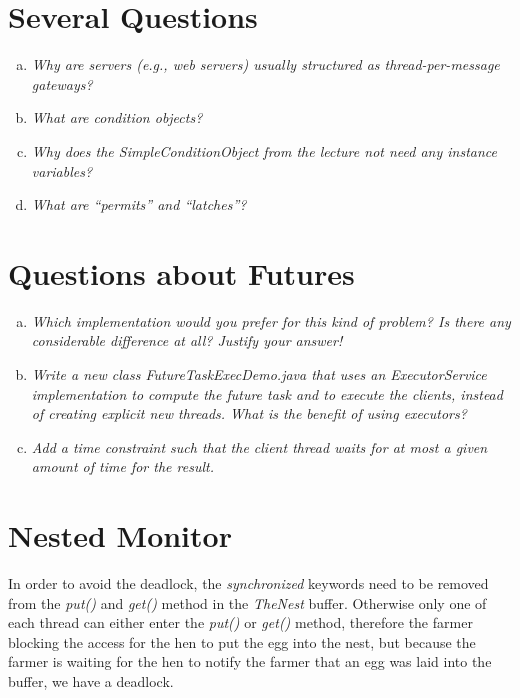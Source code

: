 \documentclass{report}
\author{Marcel \textsc{Zauder} 16-124-836 \\
	Pascal \textsc{Gerig} 16-104-721}
\begin{document}
	\section{Several Questions}
	\startsection
		\begin{enumerate}[a)]
			\item \textit{Why are servers (e.g., web servers) usually structured as thread-per-message gateways?} \\
			\item \textit{What are condition objects?} \\
			\item \textit{Why does the SimpleConditionObject from the lecture not need any instance variables?} \\
			\item \textit{What are “permits” and “latches”?} \\
		\end{enumerate}
	\closesection
	
	\section{Questions about Futures}
	\startsection
		\begin{enumerate}[a)]
			\item \textit{Which implementation would you prefer for this kind of problem? Is there any considerable difference at all? Justify your answer!} \\
			\item \textit{Write a new class FutureTaskExecDemo.java that uses an ExecutorService implementation to compute the future task and to execute the clients, instead of creating explicit new threads. What is the benefit of using executors?} \\
			\item \textit{Add a time constraint such that the client thread waits for at most a given amount of time for the result.} \\
		\end{enumerate}
	\closesection
	
	\section{Nested Monitor}
	\startsection
		In order to avoid the deadlock, the \textit{synchronized} keywords need to be removed from the \textit{put()} and \textit{get()} method in the \textit{TheNest} buffer. Otherwise only one of each thread can either enter the \textit{put()} or \textit{get()} method, therefore the farmer blocking the access for the hen to put the egg into the nest, but because the farmer is waiting for the hen to notify the farmer that an egg was laid into the buffer, we have a deadlock.
	\closesection
	
\end{document}
